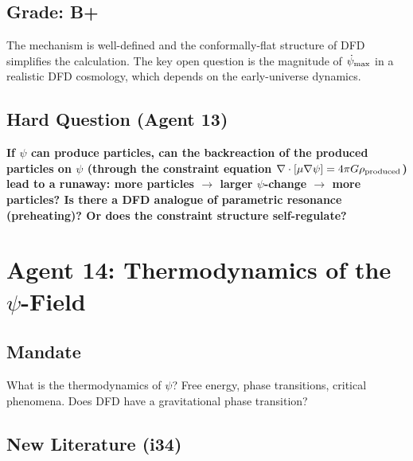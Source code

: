 \documentclass[11pt,a4paper]{article}
\begin{document}
\subsection{Grade: B+}

The mechanism is well-defined and the conformally-flat structure of DFD simplifies the calculation. The key open question is the magnitude of $\dot\psi_{\rm max}$ in a realistic DFD cosmology, which depends on the early-universe dynamics.

\subsection{Hard Question (Agent 13)}

\textbf{If $\psi$ can produce particles, can the backreaction of the produced particles on $\psi$ (through the constraint equation $\nabla\cdot[\mu\nabla\psi] = 4\pi G\rho_{\rm produced}$) lead to a runaway: more particles $\to$ larger $\psi$-change $\to$ more particles? Is there a DFD analogue of parametric resonance (preheating)? Or does the constraint structure self-regulate?}

\newpage

\section{Agent 14: Thermodynamics of the $\psi$-Field}
\label{sec:agent14}

\subsection{Mandate}

What is the thermodynamics of $\psi$? Free energy, phase transitions, critical phenomena. Does DFD have a gravitational phase transition?

\subsection{New Literature (i34)}
\end{document}
